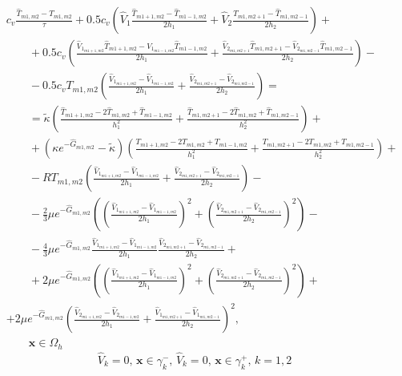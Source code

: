 \documentclass[a4paper]{article}
\theoremstyle{definition}
\numberwithin{equation}{section}
\begin{document}
\begin{eqnarray}\nonumber
& c_v\frac{\hat{T}_{m1,m2} - T_{m1,m2}}{\tau} + 0.5c_v\left( \hat{V}_1\frac{\hat{T}_{m1+1,m2} - \hat{T}_{m1-1,m2}}{2h_1} + \hat{V}_2\frac{\hat{T}_{m1,m2+1} - \hat{T}_{m1,m2-1}}{2h_2}\right) + \\ \nonumber
& \qquad + 0.5c_v\left( \frac{\hat{V}_{1_{m1+1,m2}}\hat{T}_{m1+1,m2} - \hat{V}_{1_{m1-1,m2}}\hat{T}_{m1-1,m2}}{2h_1} +  \frac{\hat{V}_{2_{m1,m2+1}}\hat{T}_{m1,m2+1} - \hat{V}_{2_{m1,m2-1}}\hat{T}_{m1,m2-1}}{2h_2} \right) - \\ \nonumber
& \qquad - 0.5c_vT_{m1,m2}\left( \frac{\hat{V}_{1_{m1+1,m2}} - \hat{V}_{1_{m1-1,m2}}}{2h_1} + \frac{\hat{V}_{2_{m1,m2+1}} - \hat{V}_{2_{m1,m2-1}}}{2h_2}\right) = \\ \nonumber
& \qquad = \tilde{\kappa}\left( \frac{\hat{T}_{m1+1,m2} - 2\hat{T}_{m1,m2} + \hat{T}_{m1-1,m2}}{h_1^2} + \frac{\hat{T}_{m1,m2+1} - 2\hat{T}_{m1,m2} + \hat{T}_{m1,m2-1}}{h_2^2} \right) + \\ \nonumber
& \qquad + (\kappa e^{-\hat{G}_{m1,m2}} - \tilde{\kappa})\left( \frac{T_{m1+1,m2} - 2T_{m1,m2} + T_{m1-1,m2}}{h_1^2} + \frac{T_{m1,m2+1} - 2T_{m1,m2} + T_{m1,m2-1}}{h_2^2} \right) + \\ \nonumber
& \qquad - RT_{m1,m2}\left( \frac{\hat{V}_{1_{m1+1,m2}} - \hat{V}_{1_{m1-1,m2}}}{2h_1} + \frac{\hat{V}_{2_{m1,m2+1}} - \hat{V}_{2_{m1,m2-1}}}{2h_2} \right) - \\ \nonumber
& \qquad - \frac{2}{3}\mu e^{-\hat{G}_{m1,m2}}\left(\left( \frac{\hat{V}_{1_{m1+1,m2}} - \hat{V}_{1_{m1-1,m2}}}{2h_1}\right)^2 + \left( \frac{\hat{V}_{2_{m1,m2+1}} - \hat{V}_{2_{m1,m2-1}}}{2h_2} \right)^2 \right)- \\ \nonumber
& \qquad - \frac{4}{3}\mu e^{-\hat{G}_{m1,m2}}\frac{\hat{V}_{1_{m1+1,m2}} - \hat{V}_{1_{m1-1,m2}}}{2h_1}\frac{\hat{V}_{2_{m1,m2+1}} - \hat{V}_{2_{m1,m2-1}}}{2h_2} + \\ \nonumber
& \qquad + 2\mu e^{-\hat{G}_{m1,m2}}\left(\left( \frac{\hat{V}_{1_{m1+1,m2}} - \hat{V}_{1_{m1-1,m2}}}{2h_1}\right)^2 + \left(\frac{\hat{V}_{2_{m1,m2+1}} - \hat{V}_{2_{m1,m2-1}}}{2h_2} \right)^2\right) +  \\ 
& + 2\mu e^{-\hat{G}_{m1,m2}}\left(\frac{\hat{V}_{2_{m1+1,m2}} - \hat{V}_{2_{m1-1,m2}}}{2h_1} + \frac{\hat{V}_{1_{m1,m2+1}} - \hat{V}_{1_{m1,m2-1}}}{2h_2} \right)^2, \\ \nonumber
& \qquad \textbf{x}\in\Omega_h
\end{eqnarray}
$$\hat{V}_k=0, \, \textbf{x}\in\gamma_k^-, \, \hat{V}_k=0, \, \textbf{x}\in\gamma_k^+, \, k=1,2$$
\end{document}
